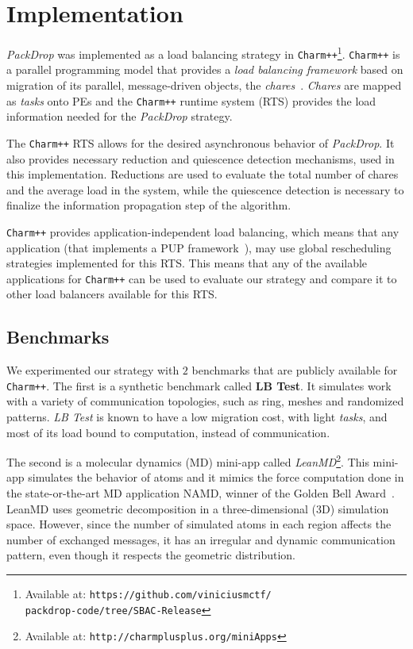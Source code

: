 \section{Implementation} \label{sec:impl}

\textit{PackDrop} was implemented as a load balancing strategy in \texttt{Charm++}\footnote{Available at: \texttt{https://github.com/viniciusmctf/\\packdrop-code/tree/SBAC-Release}}.
\texttt{Charm++} is a parallel programming model that provides a \textit{load balancing framework} based on migration of its parallel, message-driven objects, the \textit{chares}~\cite{CharmLOTR}.
\textit{Chares} are mapped as \textit{tasks} onto PEs and the \texttt{Charm++} runtime system (RTS) provides the load information needed for the \textit{PackDrop} strategy.

The \texttt{Charm++} RTS allows for the desired asynchronous behavior of \textit{PackDrop}.
It also provides necessary reduction and quiescence detection mechanisms, used in this implementation.
Reductions are used to evaluate the total number of chares and the average load in the system, while the quiescence detection is necessary to finalize the information propagation step of the algorithm.

\texttt{Charm++} provides application-independent load balancing, which means that any application (that implements a PUP framework~\cite{sc14charm}), may use global rescheduling strategies implemented for this RTS.
This means that any of the available applications for \texttt{Charm++} can be used to evaluate our strategy and compare it to other load balancers available for this RTS.


\subsection{Benchmarks} \label{sec:benchmarks}

We experimented our strategy with $2$ benchmarks that are publicly available for \texttt{Charm++}.
The first is a synthetic benchmark called \textbf{LB Test}. 
It simulates work with a variety of communication topologies, such as ring, meshes and randomized patterns.
\textit{LB Test} is known to have a low migration cost, with light \textit{tasks}, and most of its load bound to computation, instead of communication.

The second is a molecular dynamics (MD) mini-app called \textit{LeanMD}\footnote{Available at: \texttt{http://charmplusplus.org/miniApps}}.
This mini-app simulates the behavior of atoms and it mimics the force computation done in the state-or-the-art MD application NAMD, winner of the Golden Bell Award~\cite{grapevine}.
LeanMD uses geometric decomposition in a three-dimensional ($3$D) simulation space.
However, since the number of simulated atoms in each region affects the number of exchanged messages, it has an irregular and dynamic communication pattern, even though it respects the geometric distribution.

